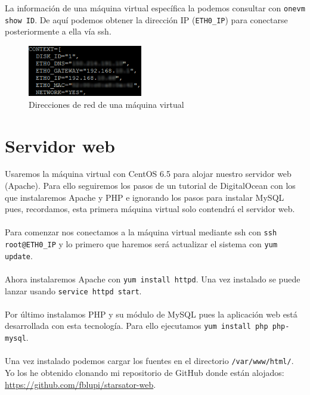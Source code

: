 La información de una máquina virtual específica la podemos consultar con \texttt{onevm show ID}. De aquí podemos obtener la dirección IP (\texttt{ETH0\_IP}) para conectarse posteriormente a ella vía ssh.

\begin{figure}[H]
	\centering
	\includegraphics[width=5cm]{img/onevm-show-context}
	\caption{Direcciones de red de una máquina virtual}
	\label{fig:onevm-show-context}
\end{figure}

\section{Servidor web}

Usaremos la máquina virtual con CentOS 6.5 para alojar nuestro servidor web (Apache). Para ello seguiremos los pasos de un tutorial de DigitalOcean \cite{InstallApachePHPCentos6.5} con los que instalaremos Apache y PHP e ignorando los pasos para instalar MySQL pues, recordamos, esta primera máquina virtual solo contendrá el servidor web.
\\ \\
Para comenzar nos conectamos a la máquina virtual mediante ssh con \texttt{ssh root@ETH0\_IP} y lo primero que haremos será actualizar el sistema con \texttt{yum update}.
\\ \\
Ahora instalaremos Apache con \texttt{yum install httpd}. Una vez instalado se puede lanzar usando \texttt{service httpd start}.
\\ \\
Por último instalamos PHP y su módulo de MySQL pues la aplicación web está desarrollada con esta tecnología. Para ello ejecutamos \texttt{yum install php php-mysql}.
\\ \\
Una vez instalado podemos cargar los fuentes en el directorio \texttt{/var/www/html/}. Yo los he obtenido clonando mi repositorio de GitHub donde están alojados: \url{https://github.com/fblupi/starsator-web}.


\newpage


